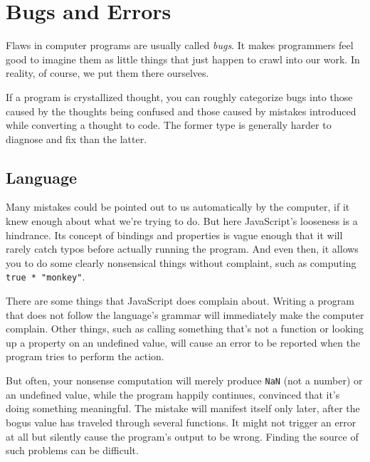 \chapter{Bugs and Errors}\label{error}


Flaws in computer programs are usually called \emph{bugs}. It makes programmers feel good to imagine them as little things that just happen to crawl into our work. In reality, of course, we put them there ourselves.

If a program is crystallized thought, you can roughly categorize bugs into those caused by the thoughts being confused and those caused by mistakes introduced while converting a thought to code. The former type is generally harder to diagnose and fix than the latter.

\section{Language}

Many mistakes could be pointed out to us automatically by the computer, if it knew enough about what we're trying to do. But here JavaScript's looseness is a hindrance. Its concept of bindings and properties is vague enough that it will rarely catch typos before actually running the program. And even then, it allows you to do some clearly nonsensical things without complaint, such as computing \lstinline`true * "monkey"`.

There are some things that JavaScript does complain about. Writing a program that does not follow the language's grammar will immediately make the computer complain. Other things, such as calling something that's not a function or looking up a property on an undefined value, will cause an error to be reported when the program tries to perform the action.

But often, your nonsense computation will merely produce \lstinline`NaN` (not a number) or an undefined value, while the program happily continues, convinced that it's doing something meaningful. The mistake will manifest itself only later, after the bogus value has traveled through several functions. It might not trigger an error at all but silently cause the program's output to be wrong. Finding the source of such problems can be difficult.

